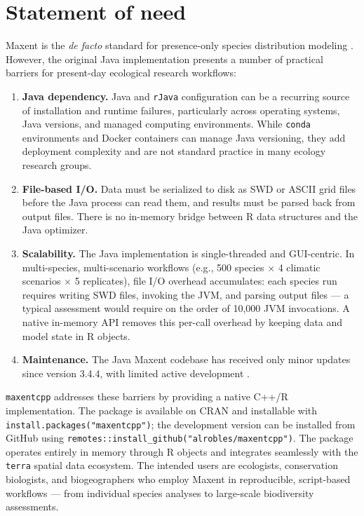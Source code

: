 \documentclass[10pt,letterpaper]{article}
\begin{document}
\section*{Statement of need}

Maxent is the \emph{de facto} standard for presence-only species
distribution modeling \cite{Merow2013}. However, the original Java
implementation presents a number of practical barriers for present-day
ecological research workflows:

\begin{enumerate}
\def\labelenumi{\arabic{enumi}.}
\item
  \textbf{Java dependency.} Java and \texttt{rJava} configuration can be
  a recurring source of installation and runtime failures, particularly
  across operating systems, Java versions, and managed computing
  environments. While \texttt{conda} environments and Docker containers
  can manage Java versioning, they add deployment complexity and are not
  standard practice in many ecology research groups.
\item
  \textbf{File-based I/O.} Data must be serialized to disk as SWD or
  ASCII grid files before the Java process can read them, and results
  must be parsed back from output files. There is no in-memory bridge
  between R data structures and the Java optimizer.
\item
  \textbf{Scalability.} The Java implementation is single-threaded and
  GUI-centric. In multi-species, multi-scenario workflows (e.g., 500
  species \(\times\) 4 climatic scenarios \(\times\) 5 replicates), file
  I/O overhead accumulates: each species run requires writing SWD files,
  invoking the JVM, and parsing output files --- a typical assessment
  would require on the order of 10,000 JVM invocations. A native
  in-memory API removes this per-call overhead by keeping data and model
  state in R objects.
\item
  \textbf{Maintenance.} The Java Maxent codebase has received only minor
  updates since version 3.4.4, with limited active development
  \cite{Phillips2017}.
\end{enumerate}

\texttt{maxentcpp} addresses these barriers by providing a native C++/R
implementation. The package is available on CRAN and installable with
\texttt{install.packages("maxentcpp")}; the development version can be
installed from GitHub using
\texttt{remotes::install\_github("alrobles/maxentcpp")}. The package
operates entirely in memory through R objects and integrates seamlessly
with the \texttt{terra} spatial data ecosystem. The intended users are
ecologists, conservation biologists, and biogeographers who employ
Maxent in reproducible, script-based workflows --- from individual
species analyses to large-scale biodiversity assessments.
\end{document}
